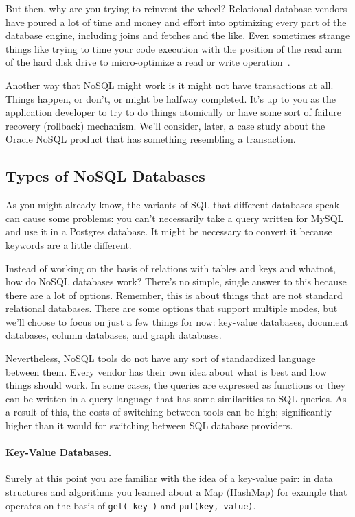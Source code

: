 But then, why are you trying to reinvent the wheel? Relational database vendors have poured a lot of time and money and effort into optimizing every part of the database engine, including joins and fetches and the like. Even sometimes strange things like trying to time your code execution with the position of the read arm of the hard disk drive to micro-optimize a read or write operation~\cite{nosql}. 

Another way that NoSQL might work is it might not have transactions at all. Things happen, or don't, or might be halfway completed. It's up to you as the application developer to try to do things atomically or have some sort of failure recovery (rollback) mechanism. We'll consider, later, a case study about the Oracle NoSQL product that has something resembling a transaction.

\subsection*{Types of NoSQL Databases}

As you might already know, the variants of SQL that different databases speak can cause some problems: you can't necessarily take a query written for MySQL and use it in a Postgres database. It might be necessary to convert it because keywords are a little different.

Instead of working on the basis of relations with tables and keys and whatnot, how do NoSQL databases work? There's no simple, single answer to this because there are a lot of options. Remember, this is about things that are not standard relational databases. There are some options that support multiple modes, but we'll choose to focus on just a few things for now: key-value databases, document databases, column databases, and graph databases.

Nevertheless, NoSQL tools do not have any sort of standardized language between them. Every vendor has their own idea about what is best and how things should work. In some cases, the queries are expressed as functions or they can be written in a query language that has some similarities to SQL queries. As a result of this, the costs of switching between tools can be high; significantly higher than it would for switching between SQL database providers.


\paragraph{Key-Value Databases.} Surely at this point you are familiar with the idea of a key-value pair: in data structures and algorithms you learned about a Map (HashMap) for example that operates on the basis of \texttt{get( key )} and \texttt{put(key, value)}. 


